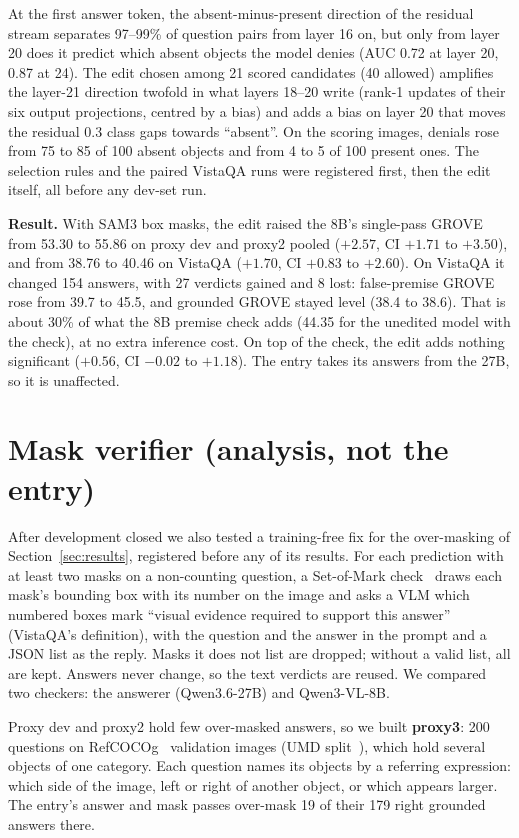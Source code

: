 \documentclass{article}
\begin{document}
At the first answer token, the absent-minus-present direction of the residual stream separates 97--99\% of question pairs from
layer 16 on, but only from layer 20 does it predict which absent objects the model denies (AUC 0.72 at layer 20, 0.87 at 24).
The edit chosen among 21 scored candidates (40 allowed) amplifies the layer-21 direction twofold in what layers 18--20 write
(rank-1 updates of their six output projections, centred by a bias) and adds a bias on layer 20 that moves the residual 0.3
class gaps towards ``absent''. On the scoring images, denials rose from 75 to 85 of 100 absent objects and from 4 to 5 of 100
present ones. The selection rules and the paired VistaQA runs were registered first, then the edit itself, all before any
dev-set run.

\textbf{Result.} With SAM3 box masks, the edit raised the 8B's single-pass GROVE from 53.30 to 55.86 on proxy dev and proxy2
pooled ($+2.57$, CI $+1.71$ to $+3.50$), and from 38.76 to 40.46 on VistaQA ($+1.70$, CI $+0.83$ to $+2.60$). On VistaQA it changed
154 answers, with 27 verdicts gained and 8 lost: false-premise GROVE rose from 39.7 to 45.5, and grounded GROVE stayed level (38.4
to 38.6). That is about 30\% of what the 8B premise check adds (44.35 for the unedited model with the check), at no extra inference
cost. On top of the check, the edit adds nothing significant ($+0.56$, CI $-0.02$ to $+1.18$). The entry takes its answers from the
27B, so it is unaffected.

\section{Mask verifier (analysis, not the entry)}\label{app:mv}
After development closed we also tested a training-free fix for the over-masking of Section~\ref{sec:results}, registered before
any of its results. For each prediction with at least two masks on a non-counting question, a Set-of-Mark check~\cite{yang2023som}
draws each mask's bounding box with its number on the image and asks a VLM which numbered boxes mark ``visual evidence required to
support this answer'' (VistaQA's definition), with the question and the answer in the prompt and a JSON list as the reply. Masks it
does not list are dropped; without a valid list, all are kept. Answers never change, so the text verdicts are reused. We compared
two checkers: the answerer (Qwen3.6-27B) and Qwen3-VL-8B.

Proxy dev and proxy2 hold few over-masked answers, so we built \textbf{proxy3}: 200 questions on RefCOCOg~\cite{mao2016refcocog}
validation images (UMD split~\cite{nagaraja2016refcocog}), which hold several objects of one category. Each question names its
objects by a referring expression: which side of the image, left or right of another object, or which appears larger. The entry's
answer and mask passes over-mask 19 of their 179 right grounded answers there.
\end{document}
